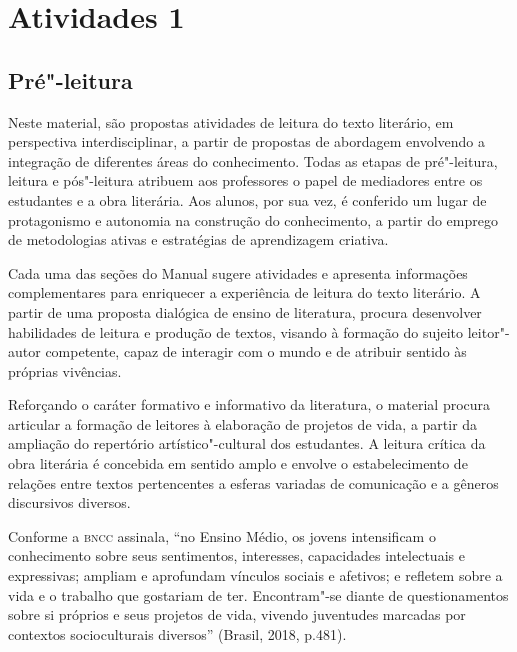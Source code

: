 \documentclass[11pt]{extarticle}
\begin{document}
\tableofcontents

\section{Atividades 1}


\subsection{Pré"-leitura}



Neste material, são propostas atividades de leitura do texto literário,
em perspectiva interdisciplinar, a partir de propostas de abordagem
envolvendo a integração de diferentes áreas do conhecimento. Todas as
etapas de pré"-leitura, leitura e pós"-leitura atribuem aos professores o
papel de mediadores entre os estudantes e a obra literária. Aos alunos,
por sua vez, é conferido um lugar de protagonismo e autonomia na
construção do conhecimento, a partir do emprego de metodologias ativas e
estratégias de aprendizagem criativa.

Cada uma das seções do Manual sugere atividades e apresenta informações
complementares para enriquecer a experiência de leitura do texto
literário. A partir de uma proposta dialógica de ensino de literatura,
procura desenvolver habilidades de leitura e produção de textos, visando
à formação do sujeito leitor"-autor competente, capaz de interagir com o
mundo e de atribuir sentido às próprias vivências.

Reforçando o caráter formativo e informativo da literatura, o material
procura articular a formação de leitores à elaboração de projetos de
vida, a partir da ampliação do repertório artístico"-cultural dos
estudantes. A leitura crítica da obra literária é concebida em sentido
amplo e envolve o estabelecimento de relações entre textos pertencentes
a esferas variadas de comunicação e a gêneros discursivos diversos.

Conforme a \textsc{bncc} assinala, ``no Ensino Médio, os jovens intensificam o
conhecimento sobre seus sentimentos, interesses, capacidades
intelectuais e expressivas; ampliam e aprofundam vínculos sociais e
afetivos; e refletem sobre a vida e o trabalho que gostariam de ter.
Encontram"-se diante de questionamentos sobre si próprios e seus projetos
de vida, vivendo juventudes marcadas por contextos socioculturais
diversos'' (Brasil, 2018, p.481).
\end{document}
